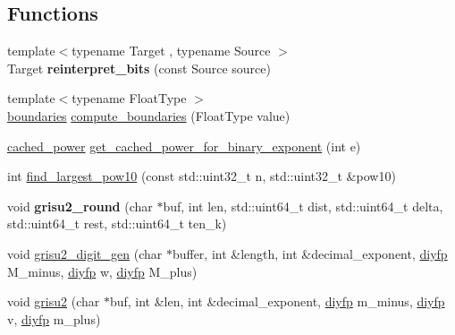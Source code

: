\subsection*{Functions}
\begin{DoxyCompactItemize}
\item 
\mbox{\label{namespacenlohmann_1_1detail_1_1dtoa__impl_a1c5d30eb51e5e994a3f48bde104d2ce8}} 
{\footnotesize template$<$typename Target , typename Source $>$ }\\Target {\bfseries reinterpret\+\_\+bits} (const Source source)
\item 
{\footnotesize template$<$typename Float\+Type $>$ }\\\mbox{\hyperlink{structnlohmann_1_1detail_1_1dtoa__impl_1_1boundaries}{boundaries}} \mbox{\hyperlink{namespacenlohmann_1_1detail_1_1dtoa__impl_a22b6e37654ac93c6d0d9c06ec1bf5ded}{compute\+\_\+boundaries}} (Float\+Type value)
\item 
\mbox{\hyperlink{structnlohmann_1_1detail_1_1dtoa__impl_1_1cached__power}{cached\+\_\+power}} \mbox{\hyperlink{namespacenlohmann_1_1detail_1_1dtoa__impl_adbf329a18c5cf854a3477327afd2200b}{get\+\_\+cached\+\_\+power\+\_\+for\+\_\+binary\+\_\+exponent}} (int e)
\item 
int \mbox{\hyperlink{namespacenlohmann_1_1detail_1_1dtoa__impl_a36ded358763b5dbcea9867660fbe4e28}{find\+\_\+largest\+\_\+pow10}} (const std\+::uint32\+\_\+t n, std\+::uint32\+\_\+t \&pow10)
\item 
\mbox{\label{namespacenlohmann_1_1detail_1_1dtoa__impl_a5bc841e0bee12fd6489d49cf7bd07bb4}} 
void {\bfseries grisu2\+\_\+round} (char $\ast$buf, int len, std\+::uint64\+\_\+t dist, std\+::uint64\+\_\+t delta, std\+::uint64\+\_\+t rest, std\+::uint64\+\_\+t ten\+\_\+k)
\item 
void \mbox{\hyperlink{namespacenlohmann_1_1detail_1_1dtoa__impl_a9b899c72b0e1e3dd46d75c2b4e6bcdfb}{grisu2\+\_\+digit\+\_\+gen}} (char $\ast$buffer, int \&length, int \&decimal\+\_\+exponent, \mbox{\hyperlink{structnlohmann_1_1detail_1_1dtoa__impl_1_1diyfp}{diyfp}} M\+\_\+minus, \mbox{\hyperlink{structnlohmann_1_1detail_1_1dtoa__impl_1_1diyfp}{diyfp}} w, \mbox{\hyperlink{structnlohmann_1_1detail_1_1dtoa__impl_1_1diyfp}{diyfp}} M\+\_\+plus)
\item 
void \mbox{\hyperlink{namespacenlohmann_1_1detail_1_1dtoa__impl_a05b681dcb8569b9784c6dccfadb01633}{grisu2}} (char $\ast$buf, int \&len, int \&decimal\+\_\+exponent, \mbox{\hyperlink{structnlohmann_1_1detail_1_1dtoa__impl_1_1diyfp}{diyfp}} m\+\_\+minus, \mbox{\hyperlink{structnlohmann_1_1detail_1_1dtoa__impl_1_1diyfp}{diyfp}} v, \mbox{\hyperlink{structnlohmann_1_1detail_1_1dtoa__impl_1_1diyfp}{diyfp}} m\+\_\+plus)

\end{DoxyCompactItemize}
